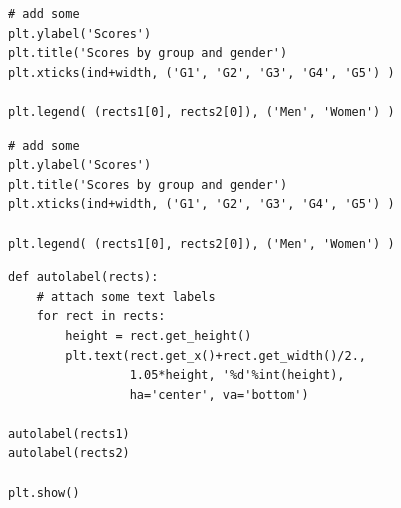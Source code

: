 \begin{frame}[fragile]
\begin{block}{}
\begin{verbatim}
# add some
plt.ylabel('Scores')
plt.title('Scores by group and gender')
plt.xticks(ind+width, ('G1', 'G2', 'G3', 'G4', 'G5') )

plt.legend( (rects1[0], rects2[0]), ('Men', 'Women') )
\end{verbatim}
\end{block}
\end{frame}

\begin{frame}[fragile]
\begin{block}{}
\begin{verbatim}
# add some
plt.ylabel('Scores')
plt.title('Scores by group and gender')
plt.xticks(ind+width, ('G1', 'G2', 'G3', 'G4', 'G5') )

plt.legend( (rects1[0], rects2[0]), ('Men', 'Women') )
\end{verbatim}
\end{block}
\end{frame}

\begin{frame}[fragile]
\begin{block}{}
\begin{verbatim}
def autolabel(rects):
    # attach some text labels
    for rect in rects:
        height = rect.get_height()
        plt.text(rect.get_x()+rect.get_width()/2.,
                 1.05*height, '%d'%int(height),
                 ha='center', va='bottom')

autolabel(rects1)
autolabel(rects2)

plt.show()
\end{verbatim}
\end{block}
\end{frame}
